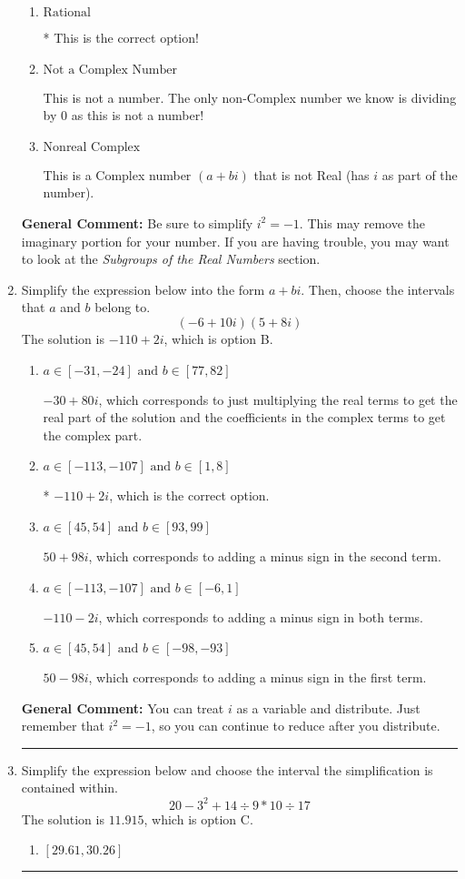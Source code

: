 \documentclass{extbook}[14pt]
\newcommand{\litem}[1]{\item #1

\rule{\textwidth}{0.4pt}}
\begin{document}
\begin{enumerate}
{\begin{enumerate}[label=\Alph*.]
This is a Complex number $(a+bi)$ that \textbf{only} has an imaginary part like $2i$.
\item \( \text{Rational} \)

* This is the correct option!
\item \( \text{Not a Complex Number} \)

This is not a number. The only non-Complex number we know is dividing by 0 as this is not a number!
\item \( \text{Nonreal Complex} \)

This is a Complex number $(a+bi)$ that is not Real (has $i$ as part of the number).
\end{enumerate}

\textbf{General Comment:} Be sure to simplify $i^2 = -1$. This may remove the imaginary portion for your number. If you are having trouble, you may want to look at the \textit{Subgroups of the Real Numbers} section.
}
\litem{
Simplify the expression below into the form $a+bi$. Then, choose the intervals that $a$ and $b$ belong to.
\[ (-6 + 10 i)(5 + 8 i) \]The solution is \( -110 + 2 i \), which is option B.\begin{enumerate}[label=\Alph*.]
\item \( a \in [-31, -24] \text{ and } b \in [77, 82] \)

 $-30 + 80 i$, which corresponds to just multiplying the real terms to get the real part of the solution and the coefficients in the complex terms to get the complex part.
\item \( a \in [-113, -107] \text{ and } b \in [1, 8] \)

* $-110 + 2 i$, which is the correct option.
\item \( a \in [45, 54] \text{ and } b \in [93, 99] \)

 $50 + 98 i$, which corresponds to adding a minus sign in the second term.
\item \( a \in [-113, -107] \text{ and } b \in [-6, 1] \)

 $-110 - 2 i$, which corresponds to adding a minus sign in both terms.
\item \( a \in [45, 54] \text{ and } b \in [-98, -93] \)

 $50 - 98 i$, which corresponds to adding a minus sign in the first term.
\end{enumerate}

\textbf{General Comment:} You can treat $i$ as a variable and distribute. Just remember that $i^2=-1$, so you can continue to reduce after you distribute.
}
\litem{
Simplify the expression below and choose the interval the simplification is contained within.
\[ 20 - 3^2 + 14 \div 9 * 10 \div 17 \]The solution is \( 11.915 \), which is option C.\begin{enumerate}[label=\Alph*.]
\item \( [29.61, 30.26] \)


\end{enumerate}}
\end{enumerate}
\end{document}
